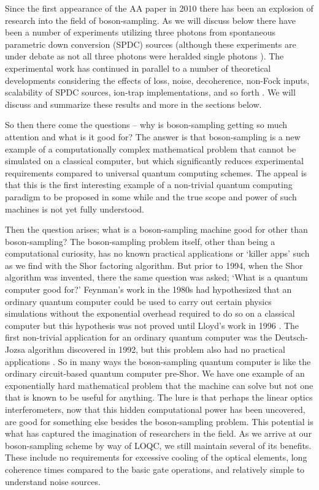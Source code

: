\documentclass[aps,pra,twocolumn,amsmath,amssymb,nofootinbib,superscriptaddress]{revtex4}
\begin{document}
Since the first appearance of the AA paper in 2010 there has been an explosion of research into the field of boson-sampling. As we will discuss below there have been a number of experiments utilizing three photons from spontaneous parametric down conversion (SPDC) sources \cite{ralph,broome,spring,anon,till,crespi} (although these experiments are under debate as not all three photons were heralded single photons \cite{bib:dowlingSchmampling}). The experimental work has continued in parallel to a number of theoretical developments considering the effects of loss, noise, decoherence, non-Fock inputs, scalability of SPDC sources, ion-trap implementations, and so forth \cite{rohde1,rohde2,jiang,motes,shch}. We will discuss and summarize these results and more in the sections below. 

So then there come the questions -- why is boson-sampling getting so much attention and what is it good for? The answer is that boson-sampling is a new example of a computationally complex mathematical problem that cannot be simulated on a classical computer, but which significantly reduces experimental requirements compared to universal quantum computing schemes. The appeal is that this is the first interesting example of a non-trivial quantum computing paradigm to be proposed in some while and the true scope and power of such machines is not yet fully understood. 

Then the question arises; what is a boson-sampling machine good for other than boson-sampling? The boson-sampling problem itself, other than being a computational curiosity, has no known practical applications or `killer apps' such as we find with the Shor factoring algorithm. But prior to 1994, when the Shor algorithm was invented, there the same question was asked; `What is a quantum computer good for?' Feynman's work in the 1980s had hypothesized that an ordinary quantum computer could be used to carry out certain physics simulations without the exponential overhead required to do so on a classical computer but this hypothesis was not proved until Lloyd's work in 1996 \cite{feyn,lloyd}. The first non-trivial application for an ordinary quantum computer was the Deutsch-Jozsa algorithm discovered in 1992, but this problem also had no practical applications \cite{deutsch}. So in many ways the boson-sampling quantum computer is like the ordinary circuit-based quantum computer pre-Shor. We have one example of an exponentially hard mathematical problem that the machine can solve but not one that is known to be useful for anything. The lure is that perhaps the linear optics interferometers, now that this hidden computational power has been uncovered, are good for something else besides the boson-sampling problem. This potential is what has captured the imagination of researchers in the field. As we arrive at our boson-sampling scheme by way of LOQC, we still maintain several of its benefits. These include no requirements for excessive cooling of the optical elements, long coherence times compared to the basic gate operations, and relatively simple to understand noise sources.
\end{document}
